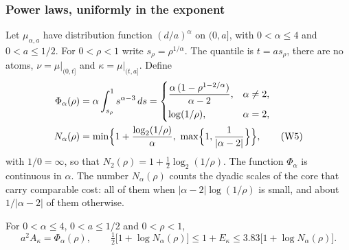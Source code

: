 \subsubsection{Power laws, uniformly in the exponent}
Let $\mu_{\alpha,a}$ have distribution function $(d/a)^\alpha$ on $(0,a]$,
with $0<\alpha\le4$ and $0<a\le1/2$. For $0<\rho<1$ write
$s_\rho=\rho^{1/\alpha}$. The quantile is $t=as_\rho$, there are no atoms,
$\nu=\mu|_{(0,t]}$ and $\kappa=\mu|_{(t,a]}$. Define
\begin{align*}
 \Phi_\alpha(\rho)&=\alpha\int_{s_\rho}^1s^{\alpha-3}\,ds
 =\begin{cases}
   \dfrac{\alpha\,(1-\rho^{1-2/\alpha})}{\alpha-2},&\alpha\ne2,\\[1.5ex]
   \log(1/\rho),&\alpha=2,
  \end{cases}\\
 N_\alpha(\rho)&=\min\Bigl\{1+\frac{\log_2(1/\rho)}{\alpha},\
 \max\Bigl\{1,\frac1{|\alpha-2|}\Bigr\}\Bigr\},
 \tag{W5}\label{eq:power-phi-n}
\end{align*}
with $1/0=\infty$, so that $N_2(\rho)=1+\tfrac12\log_2(1/\rho)$. The
function $\Phi_\alpha$ is continuous in $\alpha$. The number $N_\alpha(\rho)$
counts the dyadic scales of the core that carry comparable cost: all of
them when $|\alpha-2|\log(1/\rho)$ is small, and about $1/|\alpha-2|$ of
them otherwise.

\begin{lemma}\label{lem:power-core}
For $0<\alpha\le4$, $0<a\le1/2$ and $0<\rho<1$,
\[
 a^2A_\kappa=\Phi_\alpha(\rho),\qquad
 \tfrac12\bigl[1+\log N_\alpha(\rho)\bigr]\le1+E_\kappa
 \le3.83\bigl[1+\log N_\alpha(\rho)\bigr].
 \tag{W6}
\]
\end{lemma}


